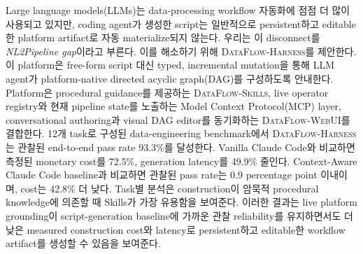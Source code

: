 Large language models(LLMs)는 data-processing workflow 자동화에 점점 더 많이 사용되고 있지만, coding agent가 생성한 script는 일반적으로 persistent하고 editable한 platform artifact로 자동 materialize되지 않는다. 우리는 이 disconnect를 \textit{NL2Pipeline gap}이라고 부른다. 이를 해소하기 위해 \textsc{DataFlow-Harness}를 제안한다. 이 platform은 free-form script 대신 typed, incremental mutation을 통해 LLM agent가 platform-native directed acyclic graph(DAG)를 구성하도록 안내한다. Platform은 procedural guidance를 제공하는 \textsc{DataFlow-Skills}, live operator registry와 현재 pipeline state를 노출하는 Model Context Protocol(MCP) layer, conversational authoring과 visual DAG editor를 동기화하는 \textsc{DataFlow-WebUI}를 결합한다. 12개 task로 구성된 data-engineering benchmark에서 \textsc{DataFlow-Harness}는 관찰된 end-to-end pass rate 93.3\%를 달성한다. Vanilla Claude Code와 비교하면 측정된 monetary cost를 72.5\%, generation latency를 49.9\% 줄인다. Context-Aware Claude Code baseline과 비교하면 관찰된 pass rate는 0.9 percentage point 이내이며, cost는 42.8\% 더 낮다. Task별 분석은 construction이 암묵적 procedural knowledge에 의존할 때 Skills가 가장 유용함을 보여준다. 이러한 결과는 live platform grounding이 script-generation baseline에 가까운 관찰 reliability를 유지하면서도 더 낮은 measured construction cost와 latency로 persistent하고 editable한 workflow artifact를 생성할 수 있음을 보여준다.
